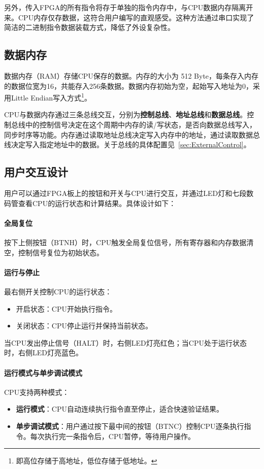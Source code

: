 \documentclass[lang=cn,a4paper,newtx]{elegantpaper}
\begin{document}
另外，传入FPGA的所有指令将存于单独的指令内存中，与CPU数据内存隔离开来。CPU内存仅存数据，这符合用户编写的直观感受。这种方法通过串口实现了简洁的二进制指令数据装载方式，降低了外设复杂性。


\subsection{数据内存}
数据内存（RAM）存储CPU保存的数据。内存的大小为 512 Byte，每条存入内存的数据位宽为16，共能存入256条数据。数据内存初始为空，起始写入地址为0，采用Little Endian写入方式\footnote{即高位存储于高地址，低位存储于低地址。}。

CPU与数据内存通过三条总线交互，分别为\textbf{控制总线}、\textbf{地址总线}和\textbf{数据总线}。控制总线中的控制信号决定在这个周期中内存的读/写状态，是否向数据总线写入，同步时序等功能。内存通过读取地址总线决定写入内存中的地址，通过读取数据总线决定写入指定地址中的数据。关于总线的具体配置见~\ref{sec:ExternalControl}。


\subsection{用户交互设计}\label{sec:interaction}
用户可以通过FPGA板上的按钮和开关与CPU进行交互，并通过LED灯和七段数码管查看CPU的运行状态和计算结果。具体设计如下：
\paragraph{全局复位}

按下上侧按钮（BTNH）时，CPU触发全局复位信号，所有寄存器和内存数据清空，控制信号复位为初始状态。

\paragraph{运行与停止}

最右侧开关控制CPU的运行状态：
\begin{itemize}
  \item 开启状态：CPU开始执行指令。
  \item 关闭状态：CPU停止运行并保持当前状态。
\end{itemize}
当CPU发出停止信号（HALT）时，右侧LED灯亮红色；当CPU处于运行状态时，右侧LED灯亮蓝色。

\paragraph{运行模式与单步调试模式}

CPU支持两种模式：
\begin{itemize}
  \item \textbf{运行模式}：CPU自动连续执行指令直至停止，适合快速验证结果。
  \item \textbf{单步调试模式}：用户通过按下最中间的按钮（BTNC）控制CPU逐条执行指令。每次执行完一条指令后，CPU暂停，等待用户操作。
\end{itemize}
\end{document}
